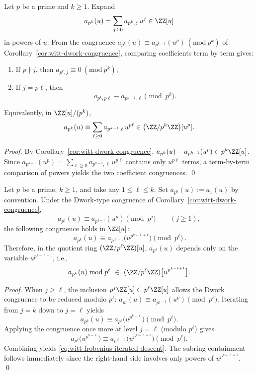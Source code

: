\begin{proposition}\label{prop:witt-pk-sparsification}
Let \(p\) be a prime and \(k\ge 1\). Expand
\[
a_{p^k}(u)=\sum_{j\ge 0}a_{p^k,j}\,u^j\in\ZZ[u]
\]
in powers of \(u\). From the congruence
\(
a_{p^k}(u)\equiv a_{p^{k-1}}(u^p)\ (\mathrm{mod}\ p^k)
\)
of Corollary~\ref{cor:witt-dwork-congruence}, comparing coefficients term by term gives:
\begin{enumerate}
  \item If \(p\nmid j\), then \(a_{p^k,j}\equiv 0\ (\mathrm{mod}\ p^k)\);
  \item If \(j=p\ell\), then
  \[
  a_{p^k,p\ell}\equiv a_{p^{k-1},\ell}\pmod{p^k}.
  \]
\end{enumerate}
Equivalently, in \(\ZZ[u]/(p^k)\),
\[
a_{p^k}(u)\equiv \sum_{\ell\ge 0}a_{p^{k-1},\ell}\,u^{p\ell}\in \bigl(\ZZ/p^k\ZZ\bigr)[u^p].
\]
\end{proposition}
\begin{proof}
By Corollary~\ref{cor:witt-dwork-congruence},
\(
a_{p^k}(u)-a_{p^{k-1}}(u^p)\in p^k\ZZ[u]
\).
Since
\(
a_{p^{k-1}}(u^p)=\sum_{\ell\ge 0}a_{p^{k-1},\ell}\,u^{p\ell}
\)
contains only \(u^{p\ell}\) terms, a term-by-term comparison of powers yields the two coefficient congruences. \qed
\end{proof}

\begin{proposition}\label{prop:witt-frobenius-iterated-descent}
Let \(p\) be a prime, \(k\ge 1\), and take any \(1\le \ell\le k\).
Set \(a_{p^0}(u):=a_1(u)\) by convention.
Under the Dwork-type congruence of Corollary~\ref{cor:witt-dwork-congruence},
\[
a_{p^j}(u)\equiv a_{p^{j-1}}(u^p)\pmod{p^j}\qquad(j\ge 1),
\]
the following congruence holds in \(\ZZ[u]\):
\begin{equation}\label{eq:witt-frobenius-iterated-descent}
\boxed{\ a_{p^k}(u)\equiv a_{p^{\ell-1}}\!\bigl(u^{p^{k-\ell+1}}\bigr)\pmod{p^\ell}\ }.
\end{equation}
Therefore, in the quotient ring \((\ZZ/p^\ell\ZZ)[u]\), \(a_{p^k}(u)\) depends only on the variable \(u^{p^{k-\ell+1}}\), i.e.,
\[
a_{p^k}(u)\bmod p^\ell\ \in\ (\ZZ/p^\ell\ZZ)\bigl[u^{p^{k-\ell+1}}\bigr].
\]
\end{proposition}
\begin{proof}
When \(j\ge \ell\), the inclusion \(p^j\ZZ[u]\subset p^\ell\ZZ[u]\) allows the Dwork congruence to be reduced modulo \(p^\ell\):
\(
a_{p^j}(u)\equiv a_{p^{j-1}}(u^p)\pmod{p^\ell}
\).
Iterating from \(j=k\) down to \(j=\ell\) yields
\[
a_{p^k}(u)\equiv a_{p^\ell}\!\bigl(u^{p^{k-\ell}}\bigr)\pmod{p^\ell}.
\]
Applying the congruence once more at level \(j=\ell\) (modulo \(p^\ell\)) gives
\[
a_{p^\ell}\!\bigl(u^{p^{k-\ell}}\bigr)\equiv a_{p^{\ell-1}}\!\bigl(u^{p^{k-\ell+1}}\bigr)\pmod{p^\ell}.
\]
Combining yields \eqref{eq:witt-frobenius-iterated-descent}.
The subring containment follows immediately since the right-hand side involves only powers of \(u^{p^{k-\ell+1}}\). \qed
\end{proof}

